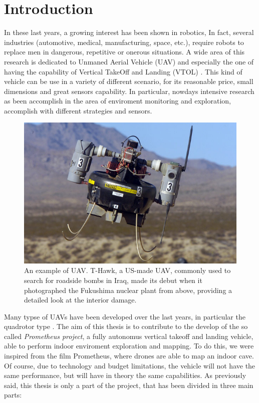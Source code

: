 \chapter{Introduction}
\label{introduction}

\renewcommand{\thepage}{\arabic{page}} 			%
\setcounter{page}{1}                   			%

In these last years, a growing interest has been shown in robotics, In fact, several industries (automotive, medical, manufacturing, space, etc.), require robots to replace men in dangerous, repetitive or onerous situations. A wide area of this research is dedicated to Unmaned Aerial Vehicle (UAV) and especially the one of having the capability of Vertical TakeOff and Landing (VTOL) \cite{largeQuadrotor}. This kind of vehicle can be use in a variety of different scenario, for its reasonable price, small dimensions and great sensors capability. In particular, nowdays intensive research as been accomplish in the area of enviroment monitoring and exploration, accomplish with different strategies and sensors.

\begin{figure}
	\includegraphics[scale=0.4]{images/fukushima.jpg}
	\caption{An example of UAV. T-Hawk, a US-made UAV, commonly used to search for roadside bombs in Iraq, made its debut when it photographed the Fukushima nuclear plant from above, providing a detailed look at the interior damage.}
	\label{fig:application}
\end{figure}  

\noindent Many typse of UAVs have been developed over the last years, in particular the quadrotor type \cite{Aalborg}. The aim of this thesis is to contribute to the develop of the so called \textit{Prometheus project}, a fully autonomus vertical takeoff and landing vehicle, able to perform indoor enviroment exploration and mapping. To do this, we were inspired from the film Prometheus, where drones are able to map an indoor cave. Of course, due to technology and budget limitations, the vehicle will not have the same performance, but will have in theory the same capabilities. As previously said, this thesis is only a part of the project, that has been divided in three main parts:

